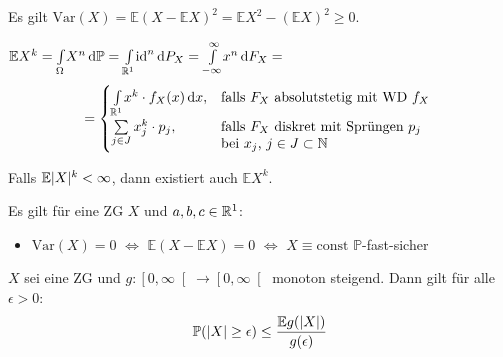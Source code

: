 \documentclass{cheat-sheet}
\renewcommand{\P}{\mathbb{P}} %
\newcommand{\E}{\mathbb{E}} %
\newcommand{\Var}{\mathrm{Var}} %
\begin{document}
\begin{lem}
  Es gilt $\Var(X) = \E (X {-} \E X)^2 = \E X^2 - (\E X)^2 \geq 0$.
\end{lem}


\begin{lem}
  $\E X^k = \Int{\Omega}{}{X^n}{\P} = \Int{\R^1}{}{\id^n}{P_X} = \Int{-\infty}{\infty}{x^n}{F_X} =$
  \[
    \qquad = \begin{cases}
      \Int{\R^1}{}{x^k \cdot f_X(x)}{x}, & \text{falls $F_X$ absolutstetig mit WD $f_X$} \\
      \sum_{j \in J} x_j^k \cdot p_j, & \parbox[t]{0.5\textwidth}{falls $F_X$ diskret mit Sprüngen $p_j$ \\ bei $x_j$, $j \in J \subset \N$}
    \end{cases}
  \]
\end{lem}

\begin{bem}
  Falls $\E \abs{X}^k < \infty$, dann existiert auch $\E X^k$.
\end{bem}

\begin{lem}
  Es gilt für eine ZG $X$ und $a, b, c \in \mathbb{R}^1$:
  \begin{itemize}
    \item $\Var(X) = 0$ $\iff$ $\E (X - \E X) = 0$ $\iff$ $X \equiv \mathrm{const}$ $\P$-fast-sicher
  \end{itemize}
\end{lem}


\begin{satz}
  $X$ sei eine ZG und $g : \left[ 0, \infty \right[ \to \left[ 0, \infty \right[$ monoton steigend. Dann gilt für alle $\epsilon > 0$:
  \[ \P(\abs{X} \geq \epsilon) \leq \frac{\E g(\abs{X})}{g(\epsilon)} \]
\end{satz}
\end{document}
